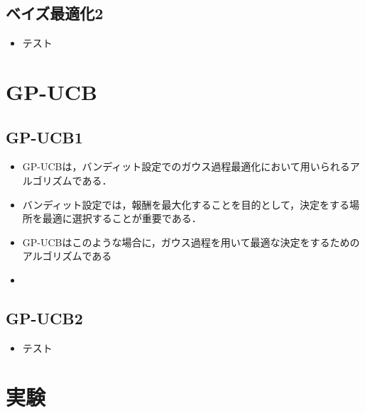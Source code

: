 \documentclass[dvipdfmx, 10.5pt]{beamer}
\begin{document}
\subsection{ベイズ最適化2}
\begin{frame}{\insertsubsection}
	\begin{itemize}
		\item テスト
	\end{itemize}

\end{frame}


\section{GP-UCB}

\subsection{GP-UCB1}

\begin{frame}{\insertsubsection}
	\begin{itemize}
		\item GP-UCBは，バンディット設定でのガウス過程最適化において用いられるアルゴリズムである．
		\item バンディット設定では，報酬を最大化することを目的として，決定をする場所を最適に選択することが重要である．
		\item GP-UCBはこのような場合に，ガウス過程を用いて最適な決定をするためのアルゴリズムである
		\item 
	\end{itemize}

\end{frame}

\subsection{GP-UCB2}
\begin{frame}{\insertsubsection}
	\begin{itemize}
		\item テスト
	\end{itemize}

\end{frame}


\section{実験}
\end{document}

